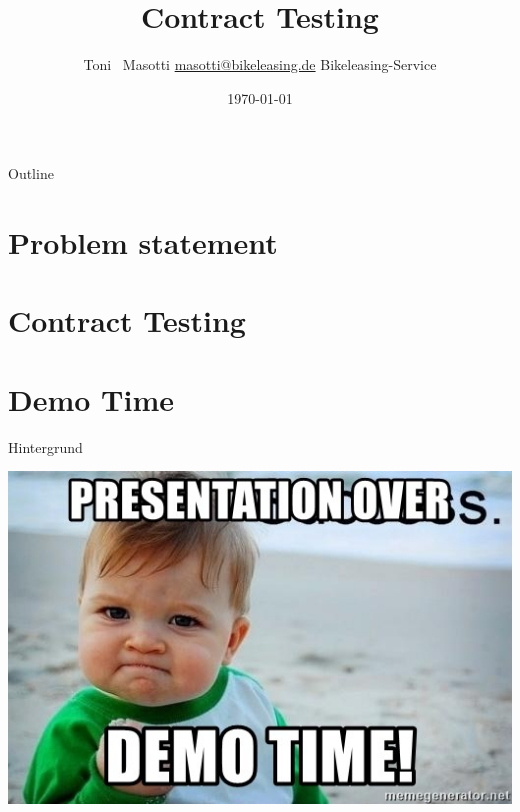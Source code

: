 


\title[Contract Testing]{Contract Testing }
\author[Toni Masotti]{\texorpdfstring{Toni ~Masotti  \newline \url{masotti@bikeleasing.de} \newline Bikeleasing-Service}{Toni Masotti}}
\date{\today}




	\begin{frame}
		\maketitle
	\end{frame}

	\begin{frame}{Outline}
		\tableofcontents
	\end{frame}


	\AtBeginSection[ ]
	{
		\frame{\tableofcontents[currentsection]}
	}

	


	\section{Problem statement}

	


	\section{Contract Testing}

	


	\section{Demo Time}

	\begin{frame}{Hintergrund}

		\begin{center}
			\includegraphics[width=.8\textwidth]{./assets/demo_time}
		\end{center}

	\end{frame}


